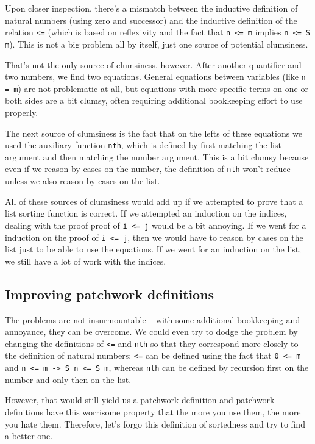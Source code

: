 \documentclass[declaration,mgr,english,shortabstract]{iithesis}
\newcommand{\m}[1]{\texttt{#1}}
\begin{document}
Upon closer inspection, there's a mismatch between the inductive definition of natural numbers (using zero and successor) and the inductive definition of the relation \m{<=} (which is based on reflexivity and the fact that \m{n <= m} implies \m{n <= S m}). This is not a big problem all by itself, just one source of potential clumsiness.


That's not the only source of clumsiness, however. After another quantifier and two numbers, we find two equations. General equations between variables (like \m{n = m}) are not problematic at all, but equations with more specific terms on one or both sides are a bit clumsy, often requiring additional bookkeeping effort to use properly.

The next source of clumsiness is the fact that on the lefts of these equations we used the auxiliary function \m{nth}, which is defined by first matching the list argument and then matching the number argument. This is a bit clumsy because even if we reason by cases on the number, the definition of \m{nth} won't reduce unless we also reason by cases on the list.

All of these sources of clumsiness would add up if we attempted to prove that a list sorting function is correct. If we attempted an induction on the indices, dealing with the proof proof of \m{i <= j} would be a bit annoying. If we went for a induction on the proof of \m{i <= j}, then we would have to reason by cases on the list just to be able to use the equations. If we went for an induction on the list, we still have a lot of work with the indices.

\subsection{Improving patchwork definitions} \label{improvingpatchwork}

The problems are not insurmountable -- with some additional bookkeeping and annoyance, they can be overcome. We could even try to dodge the problem by changing the definitions of \m{<=} and \m{nth} so that they correspond more closely to the definition of natural numbers: \m{<=} can be defined using the fact that \m{0 <= m} and \m{n <= m -> S n <= S m}, whereas \m{nth} can be defined by recursion first on the number and only then on the list.

However, that would still yield us a patchwork definition and patchwork definitions have this worrisome property that the more you use them, the more you hate them. Therefore, let's forgo this definition of sortedness and try to find a better one.
\end{document}
